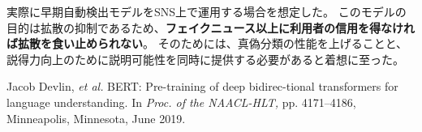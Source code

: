 {	実際に早期自動検出モデルをSNS上で運用する場合を想定した。
	このモデルの目的は拡散の抑制であるため、\textbf{フェイクニュース以上に利用者の信用を得なければ拡散を食い止められない}。
	そのためには、真偽分類の性能を上げることと、説得力向上のために説明可能性を同時に提供する必要があると着想に至った。

	{\small
		\begin{thebibliography}{99}
			\vspace*{-3mm}
			\setcounter{enumiv}{5}
			 Jacob Devlin, \textit{et al.} BERT: Pre-training of deep bidirec-tional transformers for language understanding. In \textit{Proc. of the NAACL-HLT,} pp. 4171–4186, Minneapolis, Minnesota, June 2019.
		\end{thebibliography}
	}
}

